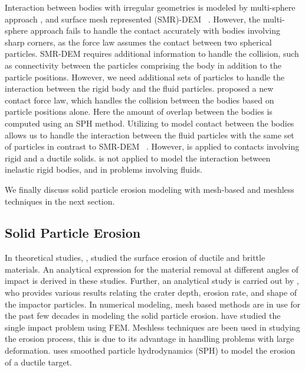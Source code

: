 Interaction between bodies with irregular geometries is modeled by multi-sphere
approach \citep{kruggel-emden_study_2008}, and surface mesh represented
(SMR)-DEM ~\citep{zhan2021surface}. However, the multi-sphere approach fails to
handle the contact accurately with bodies involving sharp corners, as the force
law assumes the contact between two spherical particles. SMR-DEM requires
additional information to handle the collision, such as connectivity between the
particles comprising the body in addition to the particle positions. However, we
need additional sets of particles to handle the interaction between the rigid
body and the fluid particles. \cite{mohseni2021particle} proposed a new contact
force law, which handles the collision between the bodies based on particle
positions alone. Here the amount of overlap between the bodies is computed using
an SPH method. Utilizing \citep{mohseni2021particle} to model contact between
the bodies allows us to handle the interaction between the fluid particles with
the same set of particles in contrast to SMR-DEM ~\cite{zhan2021surface}.
However, \citep{mohseni2021particle} is applied to contacts involving rigid and
a ductile solids. \citep{mohseni2021particle} is not applied to model the
interaction between inelastic rigid bodies, and in problems involving fluids.

We finally discuss solid particle erosion modeling with mesh-based and meshless
techniques in the next section.


\subsection{Solid Particle Erosion}
In theoretical studies, \cite{finnie1972some}, \cite{bitter1963study}
studied the surface erosion of ductile and brittle materials. An analytical
expression for the material removal at different angles of impact is derived in
these studies. Further, an analytical study is carried out by
\cite{hutchings1977erosion}, who provides various results relating the
crater depth, erosion rate, and shape of the impactor particles. In numerical
modeling, mesh based methods are in use for the past few decades in modeling the
solid particle erosion. \cite{molinari2002study,takaffoli2009finite} have
studied the single impact problem using FEM. Meshless techniques are been used
in studying the erosion process, this is due to its advantage in handling
problems with large deformation. \cite{dong2016smoothed} uses smoothed
particle hydrodynamics (SPH) to model the erosion of a ductile target.

